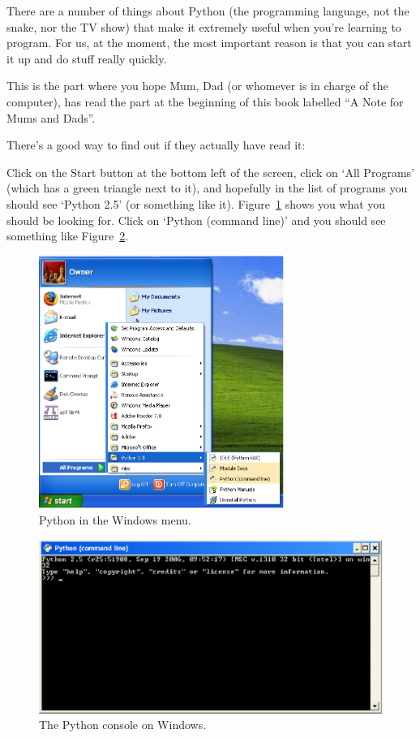 There are a number of things about Python (the programming language, not the snake, nor the TV show) that make it extremely useful when you're learning to program.  For us, at the moment, the most important reason is that you can start it up and do stuff really quickly.

This is the part where you hope Mum, Dad (or whomever is in charge of the computer), has read the part at the beginning of this book labelled ``A Note for Mums and Dads''.

\noindent
There's a good way to find out if they actually have read it:

\begin{WINDOWS}
Click on the Start button at the bottom left of the screen, click on `All Programs' (which has a green triangle next to it), and hopefully in the list of programs you should see `Python 2.5' (or something like it).  Figure~\ref{fig1} shows you what you should be looking for. Click on `Python (command line)' and you should see something like Figure~\ref{fig2}.

\begin{figure}
\begin{center}
\includegraphics[width=80mm]{eps/figure1.eps}
\end{center}
\caption{Python in the Windows menu.}\label{fig1}
\end{figure}

\begin{figure}
\begin{center}
\includegraphics[width=135mm]{eps/figure2.eps}
\end{center}
\caption{The Python console on Windows.}\label{fig2}
\end{figure}
\end{WINDOWS}

